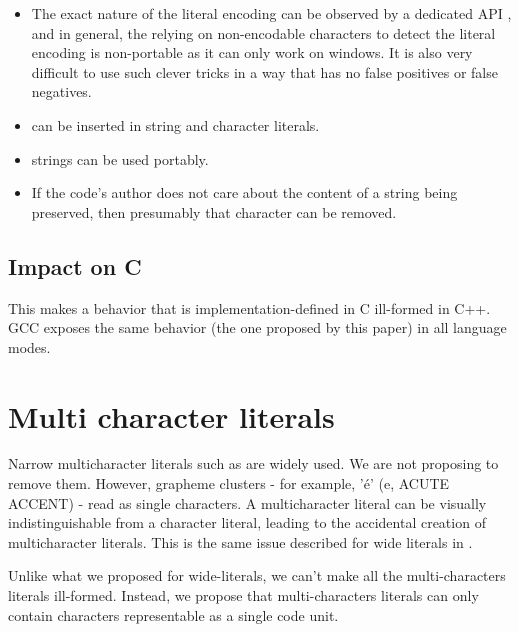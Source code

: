 \documentclass{wg21}
\begin{document}
    \begin{itemize}
        \item The exact nature of the literal encoding can be observed by a dedicated API , and in general, the relying on non-encodable characters to detect the literal encoding
        is non-portable as it can only work on windows. It is also very difficult to use such clever tricks in a way that has no false positives or false negatives.
        \item {} can be inserted in string and character literals.
        \item {} strings can be used portably.
        \item If the code's author does not care about the content of a string being preserved, then presumably that character can be removed.
    \end{itemize}
    
    \subsection{Impact on C}
    
    This makes a behavior that is implementation-defined in C ill-formed in C++.
    GCC exposes the same behavior (the one proposed by this paper) in all language modes.
    
    \section{Multi character literals}
    
    Narrow multicharacter literals such as  are widely used. We are not proposing to remove them.
    However, grapheme clusters - for example, 'é' (e, ACUTE ACCENT) - read as single characters.
    A multicharacter literal can be visually indistinguishable from a character literal, leading to the accidental creation of multicharacter literals.
    This is the same issue described for wide literals in .
    
    Unlike what we proposed for wide-literals, we can't make all the multi-characters literals ill-formed.
    Instead, we propose that multi-characters literals can only contain characters representable as a single code unit.
    
\end{document}

